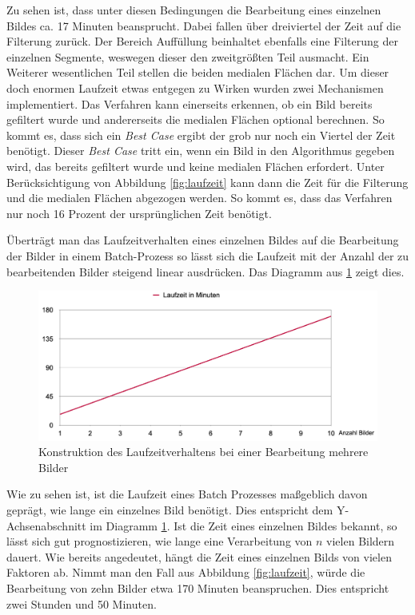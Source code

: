 Zu sehen ist, dass unter diesen Bedingungen die Bearbeitung eines einzelnen
Bildes ca. 17 Minuten beansprucht. Dabei fallen über dreiviertel der Zeit auf
die Filterung zurück. Der Bereich Auffüllung beinhaltet ebenfalls eine Filterung
der einzelnen Segmente, weswegen dieser den zweitgrößten Teil ausmacht. Ein Weiterer
wesentlichen Teil stellen die beiden medialen Flächen dar. Um dieser doch
enormen Laufzeit etwas entgegen zu Wirken wurden zwei Mechanismen implementiert.
Das Verfahren kann einerseits erkennen, ob ein Bild bereits gefiltert wurde und
andererseits die medialen Flächen optional berechnen. So kommt es, dass sich ein
\textit{Best Case} ergibt der grob nur noch ein Viertel der Zeit benötigt.
Dieser \textit{Best Case} tritt ein, wenn ein Bild in den Algorithmus gegeben
wird, das bereits gefiltert wurde und keine medialen Flächen erfordert. Unter
Berücksichtigung von Abbildung \ref{fig:laufzeit} kann dann die Zeit für die
Filterung und die medialen Flächen abgezogen werden. So kommt es, dass das
Verfahren nur noch 16 Prozent der ursprünglichen Zeit benötigt.

Überträgt man das Laufzeitverhalten eines einzelnen Bildes auf die Bearbeitung
der Bilder in einem Batch-Prozess so lässt sich die Laufzeit mit der Anzahl der
zu bearbeitenden Bilder steigend linear ausdrücken. Das Diagramm aus \ref{fig:laufzeit_batch}
zeigt dies.

\begin{figure}[h]
	\centering
	\includegraphics[width=1\textwidth]{img/runtimeBatch.png}
	\caption{Konstruktion des Laufzeitverhaltens bei einer Bearbeitung mehrere
	Bilder}
	\label{fig:laufzeit_batch}
\end{figure}

Wie zu sehen ist, ist die Laufzeit eines Batch Prozesses maßgeblich davon geprägt,
wie lange ein einzelnes Bild benötigt. Dies entspricht dem Y-Achsenabschnitt im Diagramm
\ref{fig:laufzeit_batch}. Ist die Zeit eines einzelnen Bildes bekannt, so lässt sich
gut prognostizieren, wie lange eine Verarbeitung von $n$ vielen Bildern dauert. Wie
bereits angedeutet, hängt die Zeit eines einzelnen Bilds von vielen Faktoren ab.
Nimmt man den Fall aus Abbildung \ref{fig:laufzeit}, würde die Bearbeitung von
zehn Bilder etwa 170 Minuten beanspruchen. Dies entspricht zwei Stunden und 50 Minuten.

